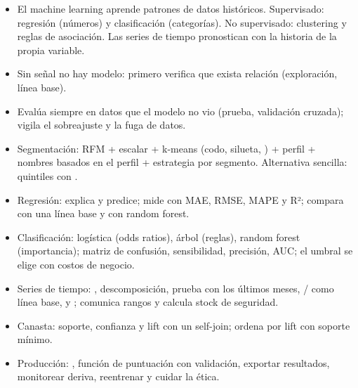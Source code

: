\begin{resumen}
\begin{itemize}
  \item El machine learning aprende patrones de datos históricos. Supervisado:
        regresión (números) y clasificación (categorías). No supervisado:
        clustering y reglas de asociación. Las series de tiempo pronostican
        con la historia de la propia variable.
  \item Sin señal no hay modelo: primero verifica que exista relación
        (exploración, línea base).
  \item Evalúa siempre en datos que el modelo no vio (prueba, validación
        cruzada); vigila el sobreajuste y la fuga de datos.
  \item Segmentación: RFM + escalar + k-means (codo, silueta, )
        + perfil + nombres basados en el perfil + estrategia por segmento.
        Alternativa sencilla: quintiles con .
  \item Regresión:  explica y predice; mide con MAE, RMSE, MAPE y
        R²; compara con una línea base y con random forest.
  \item Clasificación: logística (odds ratios), árbol (reglas), random forest
        (importancia); matriz de confusión, sensibilidad, precisión, AUC; el
        umbral se elige con costos de negocio.
  \item Series de tiempo: , descomposición, prueba con los
        últimos meses, / como línea base,
         y ; comunica rangos y calcula
        stock de seguridad.
  \item Canasta: soporte, confianza y lift con un self-join; ordena por lift
        con soporte mínimo.
  \item Producción: , función de puntuación con validación,
        exportar resultados, monitorear deriva, reentrenar y cuidar la ética.
\end{itemize}
\end{resumen}

